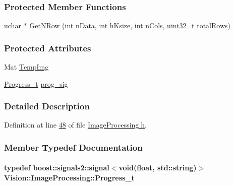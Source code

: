 \subsubsection*{Protected Member Functions}
\begin{DoxyCompactItemize}
\item 
\hyperlink{_soil_math_types_8h_a65f85814a8290f9797005d3b28e7e5fc}{uchar} $\ast$ \hyperlink{class_vision_1_1_image_processing_a56e17515a15eb7d246985e550fc89610}{Get\+N\+Row} (int n\+Data, int h\+Ksize, int n\+Cols, \hyperlink{_soil_math_types_8h_a435d1572bf3f880d55459d9805097f62}{uint32\+\_\+t} total\+Rows)
\end{DoxyCompactItemize}
\subsubsection*{Protected Attributes}
\begin{DoxyCompactItemize}
\item 
Mat \hyperlink{class_vision_1_1_image_processing_a5371ad8d6f7aac9d43ee5c902ade7435}{Temp\+Img}
\item 
\hyperlink{class_vision_1_1_image_processing_ade0de8f6751f8d19b8fbb9533a009d3c}{Progress\+\_\+t} \hyperlink{class_vision_1_1_image_processing_ac0c168e16365ff5941791f67ec895663}{prog\+\_\+sig}
\end{DoxyCompactItemize}


\subsubsection{Detailed Description}


Definition at line \hyperlink{_image_processing_8h_source_l00048}{48} of file \hyperlink{_image_processing_8h_source}{Image\+Processing.\+h}.



\subsubsection{Member Typedef Documentation}
\hypertarget{class_vision_1_1_image_processing_ade0de8f6751f8d19b8fbb9533a009d3c}{}
\paragraph[{Progress\+\_\+t}]{\setlength{\rightskip}{0pt plus 5cm}typedef boost\+::signals2\+::signal$<$void(float, std\+::string)$>$ {\bf Vision\+::\+Image\+Processing\+::\+Progress\+\_\+t}}\label{class_vision_1_1_image_processing_ade0de8f6751f8d19b8fbb9533a009d3c}


